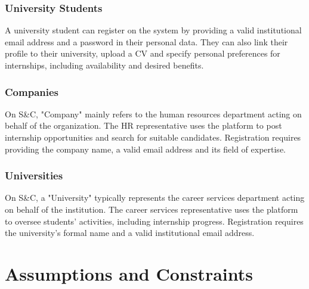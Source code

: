 \subsubsection{University Students}
A university student can register on the system by providing a valid institutional email address and a password in their personal data.
They can also link their profile to their university, upload a CV and specify personal preferences for internships, including availability and desired benefits.

\subsubsection{Companies}
On S\&C, "Company" mainly refers to the human resources department acting on behalf of the organization.
The HR representative uses the platform to post internship opportunities and search for suitable candidates.
Registration requires providing the company name, a valid email address and its field of expertise.

\subsubsection{Universities}
On S\&C, a "University" typically represents the career services department acting on behalf of the institution.
The career services representative uses the platform to oversee students' activities, including internship progress.
Registration requires the university's formal name and a valid institutional email address.

\section{Assumptions and Constraints}
